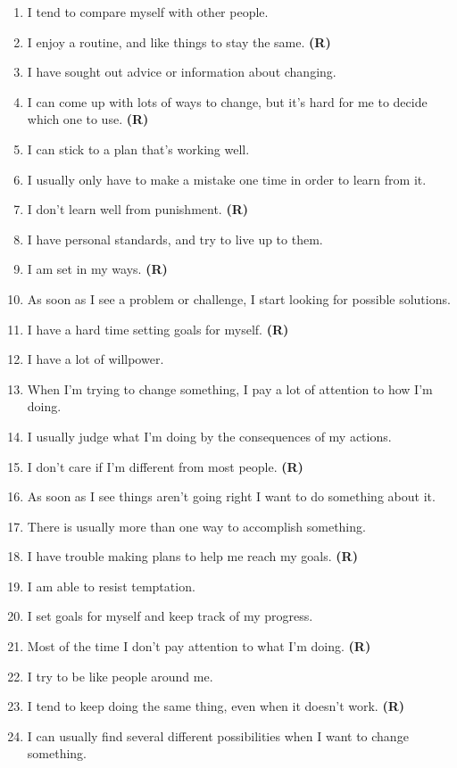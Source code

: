 \documentclass[letterpaper, nobind]{templates/ociamthesis}
\begin{document}
\begin{enumerate}
\item
  I tend to compare myself with other people.
\item
  I enjoy a routine, and like things to stay the same. \textbf{(R)}
\item
  I have sought out advice or information about changing.
\item
  I can come up with lots of ways to change, but it's hard for me to decide which one to use. \textbf{(R)}
\item
  I can stick to a plan that's working well.
\item
  I usually only have to make a mistake one time in order to learn from it.
\item
  I don't learn well from punishment. \textbf{(R)}
\item
  I have personal standards, and try to live up to them.
\item
  I am set in my ways. \textbf{(R)}
\item
  As soon as I see a problem or challenge, I start looking for possible solutions.
\item
  I have a hard time setting goals for myself. \textbf{(R)}
\item
  I have a lot of willpower.
\item
  When I'm trying to change something, I pay a lot of attention to how I'm doing.
\item
  I usually judge what I'm doing by the consequences of my actions.
\item
  I don't care if I'm different from most people. \textbf{(R)}
\item
  As soon as I see things aren't going right I want to do something about it.
\item
  There is usually more than one way to accomplish something.
\item
  I have trouble making plans to help me reach my goals. \textbf{(R)}
\item
  I am able to resist temptation.
\item
  I set goals for myself and keep track of my progress.
\item
  Most of the time I don't pay attention to what I'm doing. \textbf{(R)}
\item
  I try to be like people around me.
\item
  I tend to keep doing the same thing, even when it doesn't work. \textbf{(R)}
\item
  I can usually find several different possibilities when I want to change something.

\end{enumerate}
\end{document}
